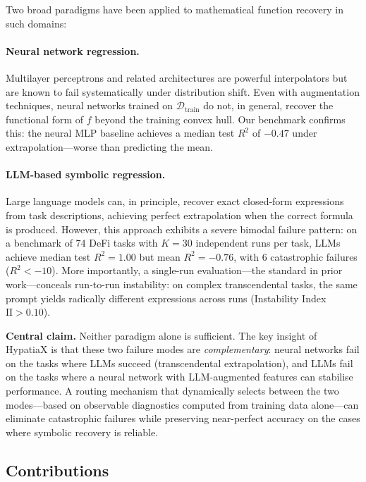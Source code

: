 \documentclass[twoside,11pt]{article}
\newcommand{\Rsq}{R^{2}}
\newcommand{\II}{\mathrm{II}}
\begin{document}
Two broad paradigms have been applied to mathematical function recovery in such
domains:

\paragraph{Neural network regression.}
Multilayer perceptrons and related architectures are powerful interpolators but
are known to fail systematically under distribution shift.  Even with augmentation
techniques, neural networks trained on $\mathcal{D}_{\mathrm{train}}$ do not, in
general, recover the functional form of $f$ beyond the training convex hull.  Our
benchmark confirms this: the neural MLP baseline achieves a median test $\Rsq$ of
$-0.47$ under extrapolation---worse than predicting the mean.

\paragraph{LLM-based symbolic regression.}
Large language models can, in principle, recover exact closed-form expressions from
task descriptions, achieving perfect extrapolation when the correct formula is
produced.  However, this approach exhibits a severe bimodal failure pattern: on
a benchmark of 74 DeFi tasks with $K=30$ independent runs per task, LLMs achieve
median test $\Rsq=1.00$ but mean $\Rsq=-0.76$, with 6 catastrophic failures
($\Rsq < -10$).  More importantly, a single-run evaluation---the standard in prior
work---conceals run-to-run instability: on complex transcendental tasks, the same
prompt yields radically different expressions across runs (Instability Index
$\II > 0.10$).

\medskip\noindent
\textbf{Central claim.}
Neither paradigm alone is sufficient.  The key insight of HypatiaX is that
these two failure modes are \emph{complementary}: neural networks fail on
the tasks where LLMs succeed (transcendental extrapolation), and LLMs fail
on the tasks where a neural network with LLM-augmented features can stabilise
performance.  A routing mechanism that dynamically selects between the two
modes---based on observable diagnostics computed from training data alone---can
eliminate catastrophic failures while preserving near-perfect accuracy on
the cases where symbolic recovery is reliable.

\subsection{Contributions}\label{subsec:contributions}
\label{sec:contributions}
\end{document}
